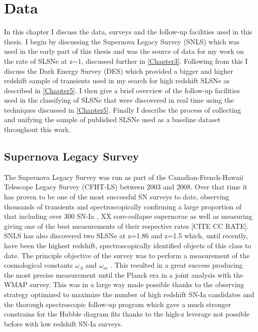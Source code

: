 
\chapter{Data} %
\label{Chapter2}

In this chapter I discuss the data, surveys and the follow-up facilities used in this thesis. I begin by discussing the Supernova Legacy Survey (SNLS) which was used in the early part of this thesis and was the source of data for my work on the rate of SLSNe at z$\sim$1, discussed further in \cref{Chapter3}. Following from this I discuss the Dark Energy Survey (DES) which provided a bigger and higher redshift sample of transients used in my search for high redshift SLSNe as described in \cref{Chapter5}. I then give a brief overview of the follow-up facilities used in the classifying of SLSNe that were discovered in real time using the techniques discussed in \cref{Chapter5}. Finally I describe the process of collecting and unifying the sample of published SLSNe used as a baseline dataset throughout this work.

\section{Supernova Legacy Survey}
The Supernova Legacy Survey \citep{Boulade2003MegaCam:Camera,Pritchet2004SNLSSurvey} was run as part of the Canadian-French-Hawaii Telescope Legacy Survey (CFHT-LS) between 2003 and 2008. Over that time it has proven to be one of the most successful SN surveys to date, observing thousands of transients and spectroscopically confirming a large proportion of that including over 300 SN-Ia \citep{Perrett2010Real-timeSurvey}, XX core-collapse supernovae as well as measuring giving one of the best measurements of their respective rates \citep{Perrett2012EVOLUTIONSURVEY} [CITE CC RATE]. SNLS has also discovered two SLSNe at z=1.86 and z=1.5 \citep{Howell2013TwoSurvey} which, until recently, have been the highest redshift, spectroscopically identified objects of this class to date. The principle objective of the survey was to perform a measurement of the cosmological constants $\omega_{\Lambda}$ and $\omega_{m}$ \citep{Sullivan2011SNLS3:PROBES,Astier2013PhotometrySNLS}. This resulted in a great success producing the most precise measurement until the Planck era in a joint analysis with the WMAP survey. This was in a large way made possible thanks to the observing strategy optimized to maximize the number of high redshift SN-Ia candidates and the thorough spectroscopic follow-up program which gave a much stronger constrains for the Hubble diagram fits thanks to the high-z leverage not possible before with low redshift SN-Ia surveys.

